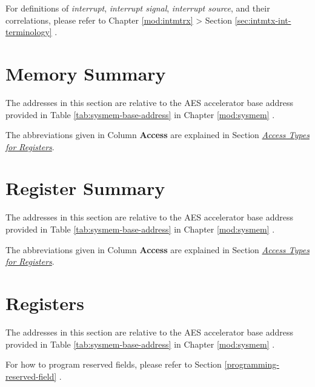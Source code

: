 \documentclass[main\_\_EN.tex]{subfiles}
\begin{document}
\begin{tiplisting}
For definitions of \textit{interrupt}, \textit{interrupt signal}, \textit{interrupt source}, and their correlations, please refer to Chapter \ref{mod:intmtrx} \textit{} > Section \ref{sec:intmtx-int-terminology} \textit{}.
\end{tiplisting}


\section{Memory Summary}\label{aesMemorySummary}

The addresses in this section are relative to the AES accelerator base address provided in Table \ref{tab:sysmem-base-address} in Chapter \ref{mod:sysmem} \textit{}.

The abbreviations given in Column \textbf{Access} are explained in Section \hyperref[glossary-access-types]{\textit{Access Types for Registers}}.





\hypertarget{aes-reg-summ}{}
\section{Register Summary}

The addresses in this section are relative to the AES accelerator base address provided in Table \ref{tab:sysmem-base-address} in Chapter \ref{mod:sysmem} \textit{}.

The abbreviations given in Column \textbf{Access} are explained in Section \hyperref[glossary-access-types]{\textit{Access Types for Registers}}.





\clearpage
\section{Registers}
The addresses in this section are relative to the AES accelerator base address provided in Table \ref{tab:sysmem-base-address} in Chapter \ref{mod:sysmem} \textit{}.

For how to program reserved fields, please refer to Section \ref{programming-reserved-field} \textit{}.



\end{document}
